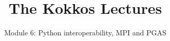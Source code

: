 
\def\sandid{SAND2020-8766 PE}

\usepackage{pgfplotstable}

\title{The Kokkos Lectures}

\author{Module 6: Python interoperability, MPI and PGAS}




\shortfalse
\mediumtrue
\fulltrue
\notoverviewtrue



% 

\begin{frame}
	\titlepage
\end{frame}

